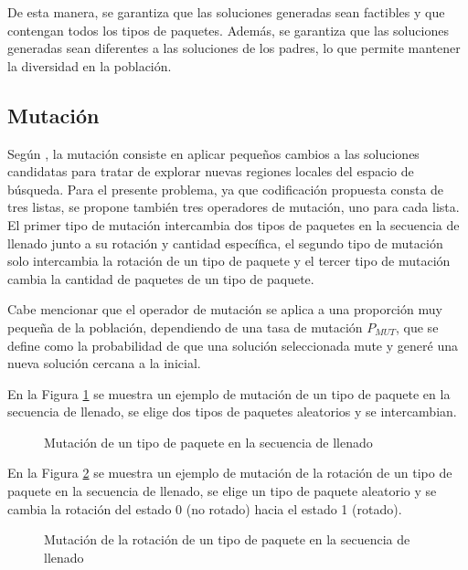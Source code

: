 De esta manera, se garantiza que las soluciones generadas sean factibles y que contengan todos los tipos de paquetes. Además, se garantiza que las soluciones generadas sean diferentes a las soluciones de los padres, lo que permite mantener la diversidad en la población.

\subsection{Mutación}

Según \textcite{Dockhorn2022}, la mutación consiste en aplicar pequeños cambios a las soluciones candidatas para tratar de explorar nuevas regiones locales del espacio de búsqueda. Para el presente problema, ya que codificación propuesta consta de tres listas, se propone también tres operadores de mutación, uno para cada lista. El primer tipo de mutación intercambia dos tipos de paquetes en la secuencia de llenado junto a su rotación y cantidad específica, el segundo tipo de mutación solo intercambia la rotación de un tipo de paquete y el tercer tipo de mutación cambia la cantidad de paquetes de un tipo de paquete.

Cabe mencionar que el operador de mutación se aplica a una proporción muy pequeña de la población, dependiendo de una tasa de mutación $P_{MUT}$, que se define como la probabilidad de que una solución seleccionada mute y generé una nueva solución cercana a la inicial.

En la Figura \ref{fig:mutacion_tipo} se muestra un ejemplo de mutación de un tipo de paquete en la secuencia de llenado, se elige dos tipos de paquetes aleatorios y se intercambian.

\begin{figure}[H]
    \centering
    
    \caption{Mutación de un tipo de paquete en la secuencia de llenado}
    \label{fig:mutacion_tipo}
\end{figure}

En la Figura \ref{fig:mutacion_rotacion} se muestra un ejemplo de mutación de la rotación de un tipo de paquete en la secuencia de llenado, se elige un tipo de paquete aleatorio y se cambia la rotación del estado 0 (no rotado) hacia el estado 1 (rotado).

\begin{figure}[H]
    \centering
    
    \caption{Mutación de la rotación de un tipo de paquete en la secuencia de llenado}
    \label{fig:mutacion_rotacion}
\end{figure}

